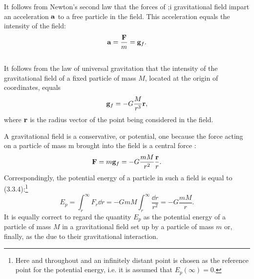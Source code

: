 It follows from Newton's second law  that the forces of ;i gravitational field impart an acceleration $\vb{a}$ to a free particle in the field. This acceleration equals the intensity of the field:
\begin{equation*}%
\vb{a} = \frac{\vb{F}}{m} = \vb{g}_{f}.
\end{equation*}

\subsection{}\label{6.2.2} It follows from the law of universal gravitation  that the intensity of the gravitational field of a fixed particle of mass $M$, located at the origin of coordinates, equals
\begin{equation*}%
\vb{g}_{f} = - G \frac{M}{r^{3}} \vb{r},
\end{equation*}
where $\vb{r}$ is the radius vector of the point being considered in the field.

A gravitational field is a conservative, or potential, one  because the force acting on a particle of mass m brought into the field is a central force :
\begin{equation*}%
\vb{F} = m\vb{g}_{f} = - G \frac{mM}{r^{2}} \frac{\vb{r}}{r}.
\end{equation*}
Correspondingly, the potential energy of a particle in such a field is equal to (3.3.4):\footnote{Here and throughout  and  an infinitely distant point is chosen as the reference point for the potential energy, i.e. it is assumed that $E_{p} (\infty) = 0$.}
\begin{equation*}%
E_{p} = \int_{r}^{\infty} F_{r} \dd r = -GmM \int_{r}^{\infty} \frac{\dd r}{r^{2}} = -G\frac{mM}{r}.
\end{equation*}
It is equally correct to regard the quantity $E_{p}$ as the potential energy of a particle of mass $M$ in a gravitational field set up by a particle of mass $m$ or, finally, as the  due to their gravitational interaction.

